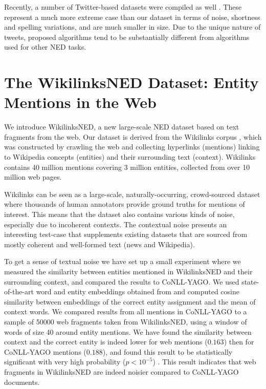 \documentclass[11pt,letterpaper]{article}
\begin{document}
	Recently, a number of Twitter-based datasets were compiled as well \cite{Meij202Adding,fromreide2014crowdsourcing}. These represent a much more extreme case than our dataset in terms of noise, shortness and spelling variations, and are much smaller in size. Due to the unique nature of tweets, proposed algorithms tend to be substantially different from algorithms used for other NED tasks.
	
	\section{The WikilinksNED Dataset: \qquad\qquad Entity Mentions in the Web}
	\label{sec:w}
	
	We introduce WikilinksNED, a new large-scale NED dataset based on text fragments from the web. Our dataset is derived from the Wikilinks corpus \cite{singh12:wiki-links}, which was constructed by crawling the web and collecting hyperlinks (mentions) linking to Wikipedia concepts (entities) and their surrounding text (context). Wikilinks contains 40 million mentions covering 3 million entities, collected from over 10 million web pages. 
	
	Wikilinks can be seen as a large-scale, naturally-occurring, crowd-sourced dataset where thousands of human annotators provide ground truths for mentions of interest. This means that the dataset also contains various kinds of noise, especially due to incoherent contexts. The contextual noise presents an interesting test-case that supplements existing datasets that are sourced from mostly coherent and well-formed text (news and Wikipedia). 
	
	To get a sense of textual noise we have set up a small experiment where we measured the similarity between entities mentioned in WikilinksNED and their surrounding context, and compared the results to CoNLL-YAGO. We used state-of-the-art word and entity embeddings obtained from  and computed cosine similarity between embeddings of the correct entity assignment and the mean of context words. We compared results from all mentions in CoNLL-YAGO to a sample of 50000 web fragments taken from WikilinksNED, using a window of words of size 40 around entity mentions. We have found the similarity between context and the correct entity is indeed lower for web mentions ($0.163$) then for CoNLL-YAGO mentions ($0.188$), and found this result to be statistically significant with very high probability ($p<10^{-5}$) . This result indicates that web fragments in WikilinksNED are indeed noisier compared to CoNLL-YAGO documents.
	
\end{document}
